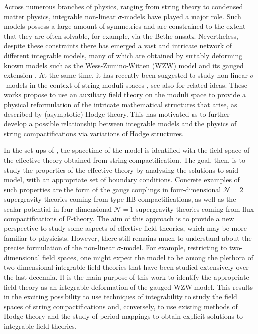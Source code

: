 \documentclass[11pt,a4paper]{article}
\numberwithin{equation}{section}
\numberwithin{table}{section}\setlength{\multlinegap}{25pt}
\begin{document}
Across numerous branches of physics, ranging from string theory to condensed matter physics, integrable non-linear $\sigma$-models have played a major role. 
Such models possess a large amount of symmetries and are constrained to the extent that they are often solvable, for example, via the Bethe ansatz. Nevertheless, despite these constraints there has emerged a vast and intricate network of different integrable models, many of which are obtained by suitably deforming known models such as the Wess-Zumino-Witten (WZW) model and its gauged extension \cite{Wess:1971,Witten:1983_current_algebra,Witten:1983_bosonization,Gawedzki:1988_I,Gawedzki:1988_II,Witten:1991}. At the same time, it has recently been suggested to study non-linear $\sigma$-models in the context of string moduli spaces \cite{Grimm:2020cda,Grimm:2021ikg}, see also \cite{Cecotti:2020uek} for related ideas. These works propose to use an auxiliary field theory on the moduli space to provide a physical reformulation of the intricate mathematical structures that arise, as described by (asymptotic) Hodge theory. This has motivated us to further develop a possible relationship between integrable models and the physics of string compactifications via variations of Hodge structures. 

In the set-ups of \cite{Grimm:2020cda,Cecotti:2020uek,Grimm:2021ikg}, the spacetime of the model is identified with the field space of the effective theory obtained from string compactification. The goal, then, is to study the properties of the effective theory by analysing the solutions to said model, with an appropriate set of boundary conditions. Concrete examples of such properties are the form of the gauge couplings in four-dimensional $\mathcal{N}=2$ supergravity theories coming from type IIB compactifications, as well as the scalar potential in four-dimensional $\mathcal{N}=1$ supergravity theories coming from flux compactifications of F-theory. The aim of this approach is to provide a new perspective to study some aspects of effective field theories, which may be more familiar to physicists. However, there still remains much to understand about the precise formulation of the non-linear $\sigma$-model. For example, restricting to two-dimensional field spaces, one might expect the model to be among the plethora of two-dimensional integrable field theories that have been studied extensively over the last decennia. It is the main purpose of this work to identify the appropriate field theory as an integrable deformation of the gauged WZW model. This results in the exciting possibility to use techniques of integrability to study the field spaces of string compactifications and, conversely, to use existing methods of %
Hodge theory and the study of period mappings to obtain explicit solutions to integrable field theories.
\end{document}
